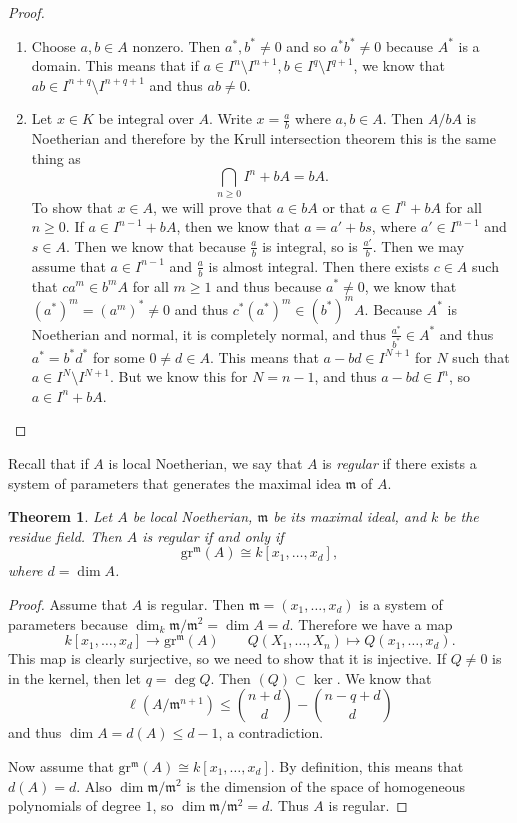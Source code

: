 \documentclass[leqno, openany]{memoir}
\newtheorem{thm}{Theorem}[section]
\theoremstyle{definition}
\theoremstyle{remark}
\theoremstyle{plain}
\theoremstyle{definition}
\theoremstyle{remark}
\newcommand{\mf}[1]{\mathfrak{#1}}
\newcommand{\mr}[1]{\mathrm{#1}}
\begin{document}
\begin{proof}
    \begin{enumerate}
        \item Choose $a,b \in A$ nonzero. Then $a^*, b^* \neq 0$ and so $a^* b^* \neq 0$ because $A^*$ is a domain. This means that if $a \in I^n \setminus I^{n+1}, b \in I^q \setminus I^{q+1}$, we know that $ab \in I^{n+q} \setminus I^{n+q+1}$ and thus $ab \neq 0$.
        \item Let $x \in K$ be integral over $A$. Write $x = \frac{a}{b}$ where $a,b \in A$. Then $A/bA$ is Noetherian and therefore by the Krull intersection theorem this is the same thing as
            \[ \bigcap_{n \geq 0} I^n + bA = bA. \]
            To show that $x \in A$, we will prove that $a \in bA$ or that $a \in I^n + bA$ for all $n \geq 0$. If $a \in I^{n-1} + bA$, then we know that $a = a' + bs$, where $a' \in I^{n-1}$ and $s \in A$. Then we know that because $\frac{a}{b}$ is integral, so is $\frac{a'}{b}$. Then we may assume that $a \in I^{n-1}$ and $\frac{a}{b}$ is almost integral. Then there exists $c \in A$ such that $ca^m \in b^m A$ for all $m \geq 1$ and thus because $a^* \neq 0$, we know that $(a^*)^m = (a^m)^* \neq 0$ and thus $c^* (a^*)^m \in (b^*)^m A$. Because $A^*$ is Noetherian and normal, it is completely normal, and thus $\frac{a^*}{b^*} \in A^*$ and thus $a^* = b^* d^*$ for some $0 \neq d \in A$. This means that $a-bd \in I^{N+1}$ for $N$ such that $a \in I^N \setminus I^{N+1}$. But we know this for $N = n-1$, and thus $a-bd \in I^n$, so $a \in I^n + bA$. \qedhere
    \end{enumerate}
\end{proof}

Recall that if $A$ is local Noetherian, we say that $A$ is \textit{regular} if there exists a system of parameters that generates the maximal idea $\mf{m}$ of $A$.

\begin{thm}
    Let $A$ be local Noetherian, $\mf{m}$ be its maximal ideal, and $k$ be the residue field. Then $A$ is regular if and only if
    \[ \mr{gr}^{\mf{m}}(A) \cong k[x_1, \ldots, x_d], \]
    where $d = \dim A$.
\end{thm}

\begin{proof}
    Assume that $A$ is regular. Then $\mf{m} = (x_1, \ldots, x_d)$ is a system of parameters because $\dim_k \mf{m} / \mf{m}^2 = \dim A = d$. Therefore we have a map
    \[ k[x_1, \ldots, x_d] \longrightarrow \mr{gr}^{\mf{m}}(A) \qquad Q(X_1, \ldots, X_n) \mapsto Q(x_1, \ldots, x_d). \]
    This map is clearly surjective, so we need to show that it is injective. If $Q \neq 0$ is in the kernel, then let $q = \deg Q$. Then $(Q) \subset \ker$. We know that
    \[ \ell(A / \mf{m}^{n+1}) \leq \binom{n+d}{d} - \binom{n-q+d}{d} \]
    and thus $\dim A = d(A) \leq d-1$, a contradiction.

    Now assume that $\mr{gr}^{\mf{m}}(A) \cong k[x_1, \ldots, x_d]$. By definition, this means that $d(A) = d$. Also $\dim \mf{m} / \mf{m}^2$ is the dimension of the space of homogeneous polynomials of degree $1$, so $\dim \mf{m} / \mf{m}^2 = d$. Thus $A$ is regular.
\end{proof}
\end{document}
